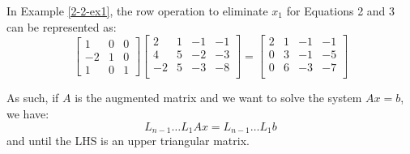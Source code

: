 \documentclass[../main/main.tex]{subfiles}
\begin{document}
\begin{example}
  In Example \ref{2-2-ex1}, the row operation to eliminate $x_{1}$ for Equations 2 and 3 can be represented as:
  \[
  \begin{bmatrix}
    1&0&0\\
    -2&1&0\\
    1&0&1
  \end{bmatrix}
  \left[
\begin{array}{ccc|c}
  2&1&-1&-1 \\
  4&5&-2&-3 \\
  -2&5&-3&-8 \\
\end{array}
\right]
=
  \left[
\begin{array}{ccc|c}
  2&1&-1&-1 \\
  0&3&-1&-5 \\
  0&6&-3&-7 \\
\end{array}
\right]
  \]
\end{example}

As such, if $A$ is the augmented matrix and we want to solve the system $Ax = b$, we have: \[
L_{n-1}\ldots L_1 Ax = L_{n-1}\ldots L_1b
\] and until the LHS is an upper triangular matrix.
\end{document}
